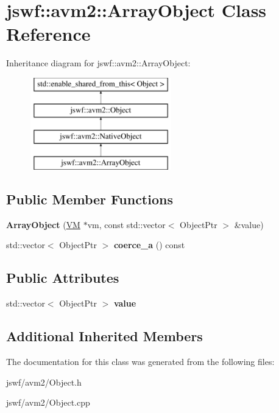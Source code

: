 \hypertarget{classjswf_1_1avm2_1_1_array_object}{\section{jswf\+:\+:avm2\+:\+:Array\+Object Class Reference}
\label{classjswf_1_1avm2_1_1_array_object}
}
Inheritance diagram for jswf\+:\+:avm2\+:\+:Array\+Object\+:\begin{figure}[H]
\begin{center}
\leavevmode
\includegraphics[height=4.000000cm]{classjswf_1_1avm2_1_1_array_object}
\end{center}
\end{figure}
\subsection*{Public Member Functions}
\begin{DoxyCompactItemize}
\item 
\hypertarget{classjswf_1_1avm2_1_1_array_object_a40dfb5f661e807f95060add2688d6134}{{\bfseries Array\+Object} (\hyperlink{classjswf_1_1avm2_1_1_v_m}{V\+M} $\ast$vm, const std\+::vector$<$ Object\+Ptr $>$ \&value)}\label{classjswf_1_1avm2_1_1_array_object_a40dfb5f661e807f95060add2688d6134}

\item 
\hypertarget{classjswf_1_1avm2_1_1_array_object_a45a025fba48de3584e031b53ec45baea}{std\+::vector$<$ Object\+Ptr $>$ {\bfseries coerce\+\_\+a} () const }\label{classjswf_1_1avm2_1_1_array_object_a45a025fba48de3584e031b53ec45baea}

\end{DoxyCompactItemize}
\subsection*{Public Attributes}
\begin{DoxyCompactItemize}
\item 
\hypertarget{classjswf_1_1avm2_1_1_array_object_a2153f43610d8e7da419d8f8b42e490ef}{std\+::vector$<$ Object\+Ptr $>$ {\bfseries value}}\label{classjswf_1_1avm2_1_1_array_object_a2153f43610d8e7da419d8f8b42e490ef}

\end{DoxyCompactItemize}
\subsection*{Additional Inherited Members}


The documentation for this class was generated from the following files\+:\begin{DoxyCompactItemize}
\item 
jswf/avm2/Object.\+h\item 
jswf/avm2/Object.\+cpp\end{DoxyCompactItemize}

